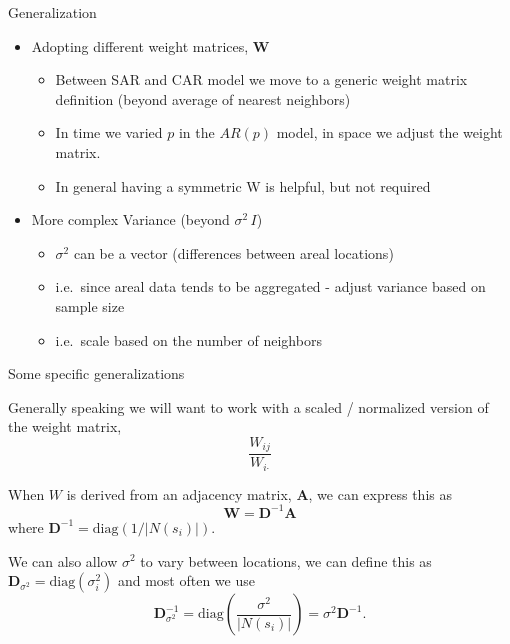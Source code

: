 \documentclass[11pt,ignorenonframetext,]{beamer}
\begin{document}
\begin{frame}[t]{Generalization}
\protect\hypertarget{generalization}{}

\begin{itemize}
\item
  Adopting different weight matrices, \(\symbf{W}\)

  \begin{itemize}
  \item
    Between SAR and CAR model we move to a generic weight matrix
    definition (beyond average of nearest neighbors)
  \item
    In time we varied \(p\) in the \(AR(p)\) model, in space we adjust
    the weight matrix.
  \item
    In general having a symmetric W is helpful, but not required
  \end{itemize}
\end{itemize}

\pause

\begin{itemize}
\item
  More complex Variance (beyond \(\sigma^2 \, I\))

  \begin{itemize}
  \item
    \(\sigma^2\) can be a vector (differences between areal locations)
  \item
    i.e.~since areal data tends to be aggregated - adjust variance based
    on sample size
  \item
    i.e.~scale based on the number of neighbors
  \end{itemize}
\end{itemize}

\end{frame}

\begin{frame}[t]{Some specific generalizations}
\protect\hypertarget{some-specific-generalizations}{}

Generally speaking we will want to work with a scaled / normalized
version of the weight matrix,
\[ \frac{W_{ij}}{W_{i\boldsymbol{\cdot}}}  \]

When \(W\) is derived from an adjacency matrix, \(\symbf{A}\), we can
express this as \[ \symbf{W} = \symbf{D}^{-1} \symbf{A} \] where
\(\symbf{D}^{-1} = \text{diag}(1/|N(s_i)|)\).

We can also allow \(\sigma^2\) to vary between locations, we can define
this as \(\symbf{D}_{\sigma^2} = \text{diag}(\sigma^2_i)\) and most
often we use
\[ \symbf{D}_{\sigma^2}^{-1} = \text{diag}\left(\frac{\sigma^2}{|N(s_i)|}\right) =  \sigma^2 \symbf{D}^{-1}.  \]

\end{frame}
\end{document}

